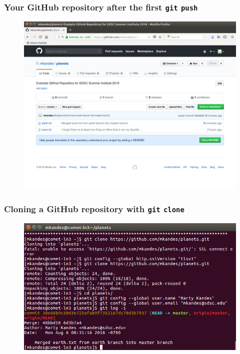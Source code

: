\documentclass{beamer}
\begin{document}
\begin{frame}
   \frametitle{Your GitHub repository after the first \texttt{git} \texttt{push}}
   \begin{figure}[htbp]
      \includegraphics[width=1.0\textwidth]{images/github-repo-after-first-push-web.png}
   \end{figure}
\end{frame}

\begin{frame}
   \frametitle{Cloning a GitHub repository with \texttt{git} \texttt{clone}}
   \begin{figure}[htbp]
      \includegraphics[width=1.0\textwidth]{images/git-clone-github-repo-to-comet.png}
   \end{figure}
\end{frame}
\end{document}
